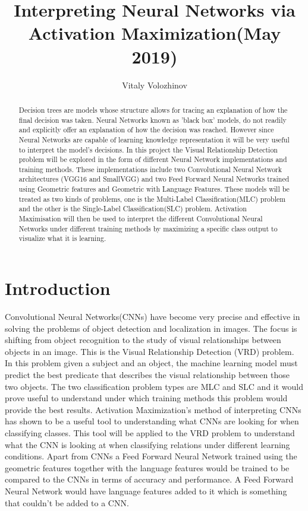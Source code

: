 \documentclass{IEEEtran}
\title{Interpreting Neural Networks via Activation Maximization(May 2019)}
\author{Vitaly Volozhinov}
\begin{document}
\maketitle
\begin{abstract}
Decision trees are models whose structure allows for tracing an explanation of how the
final decision was taken. Neural Networks known as ’black box’ models, do not readily and
explicitly offer an explanation of how the decision was reached. However since Neural Networks are capable of learning knowledge representation it will be very useful to interpret
the model’s decisions. In this project the Visual Relationship Detection problem will be explored in the form of different Neural Network implementations and training methods. These implementations include two Convolutional Neural Network architectures (VGG16 and SmallVGG) and two Feed Forward Neural Networks trained using Geometric features and Geometric
with Language Features. These models will be treated as two kinds of problems, one is the
Multi-Label Classification(MLC) problem and the other is the Single-Label Classification(SLC) problem. Activation Maximisation will then be used to interpret the different Convolutional Neural Networks under different training methods by maximizing a specific class output to visualize what it is learning.
\end{abstract}

\section{Introduction}
Convolutional Neural Networks(CNNs) have become very precise and effective in solving the problems of object detection and localization in images. The focus is shifting from object recognition to the study of visual relationships between objects in an image. This is the Visual Relationship Detection (VRD) problem. In this problem given a subject and an object, the machine learning model must predict the best predicate that describes the visual relationship between those two objects. The two classification problem types are MLC and SLC and it would prove useful to understand under which training methods this problem would provide the best results. Activation Maximization's method of interpreting CNNs has shown to be a useful tool to understanding what CNNs are looking for when classifying classes. This tool will be applied to the VRD problem to understand what the CNN is looking at when classifying relations under different learning conditions. Apart from CNNs a Feed Forward Neural Network trained using the geometric features together with the language features would be trained to be compared to the CNNs in terms of accuracy and performance. A Feed Forward Neural Network would have language features added to it which is something that couldn't be added to a CNN.
\end{document}
